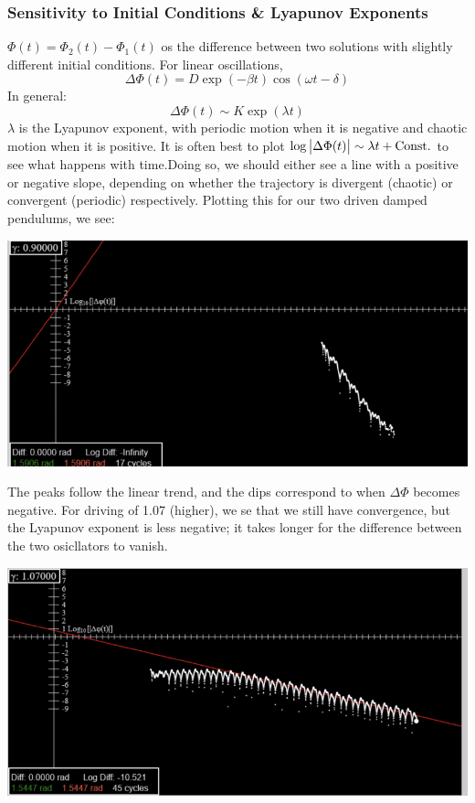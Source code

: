 \documentclass[../PHYS306Notes.tex]{subfiles}
\begin{document}
\subsubsection{Sensitivity to Initial Conditions \& Lyapunov Exponents}
$\Phi(t) = \Phi_2(t) - \Phi_1(t)$ os the difference between two solutions with slightly different initial conditions. For linear oscillations,
\[\Delta \Phi(t) = D\exp(-\beta t)\cos(\omega t - \delta)\]
In general:
\[\Delta \Phi(t) \sim K\exp(\lambda t)\]
$\lambda$ is the Lyapunov exponent, with periodic motion when it is negative and chaotic motion when it is positive. It is often best to plot $\log\abs{\Delta \Phi(t)} \sim \lambda t + \text{Const.}$ to see what happens with time.Doing so, we should either see a line with a positive or negative slope, depending on whether the trajectory is divergent (chaotic) or convergent (periodic) respectively. Plotting this for our two driven damped pendulums, we see:
\begin{center}
    \includegraphics[scale=0.7]{Lecture-33/l33-img5.png}
\end{center}
The peaks follow the linear trend, and the dips correspond to when $\Delta \Phi$ becomes negative. For driving of 1.07 (higher), we se that we still have convergence, but the Lyapunov exponent is less negative; it takes longer for the difference between the two osicllators to vanish.
\begin{center}
    \includegraphics[scale=0.7]{Lecture-33/l33-img6.png}
\end{center}
\end{document}
